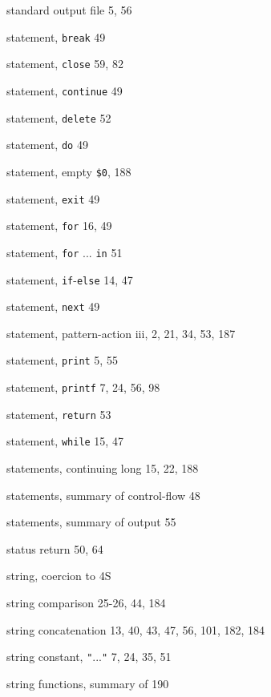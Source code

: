 \begin{multicols}{3}
\hangindent=3pc  standard output file 5, 56

\hangindent=3pc  statement, \verb'break' 49

\hangindent=3pc  statement, \verb'close' 59, 82

\hangindent=3pc  statement, \verb'continue' 49

\hangindent=3pc  statement, \verb'delete' 52

\hangindent=3pc  statement, \verb'do' 49

\hangindent=3pc  statement, empty \verb'$0', 188

\hangindent=3pc  statement, \verb'exit' 49

\hangindent=3pc  statement, \verb'for' 16, 49

\hangindent=3pc  statement, \verb'for' ... \verb'in' 51

\hangindent=3pc  statement, \verb'if'-\verb'else' 14, 47

\hangindent=3pc  statement, \verb'next' 49

\hangindent=3pc  statement, pattern-action iii, 2, 21, 34, 53, 187

\hangindent=3pc  statement, \verb'print' 5, 55

\hangindent=3pc  statement, \verb'printf' 7, 24, 56, 98

\hangindent=3pc  statement, \verb'return' 53

\hangindent=3pc  statement, \verb'while' 15, 47

\hangindent=3pc  statements, continuing long 15, 22, 188

\hangindent=3pc  statements, summary of control-flow 48

\hangindent=3pc  statements, summary of output 55

\hangindent=3pc  status return 50, 64

\hangindent=3pc  string, coercion to 4S

\hangindent=3pc  string comparison 25-26, 44, 184

\hangindent=3pc  string concatenation 13, 40, 43,  47, 56, 101, 182, 184

\hangindent=3pc  string constant, \verb'"'...\verb'"' 7, 24, 35, 51

\hangindent=3pc  string functions, summary of 190


\end{multicols}
